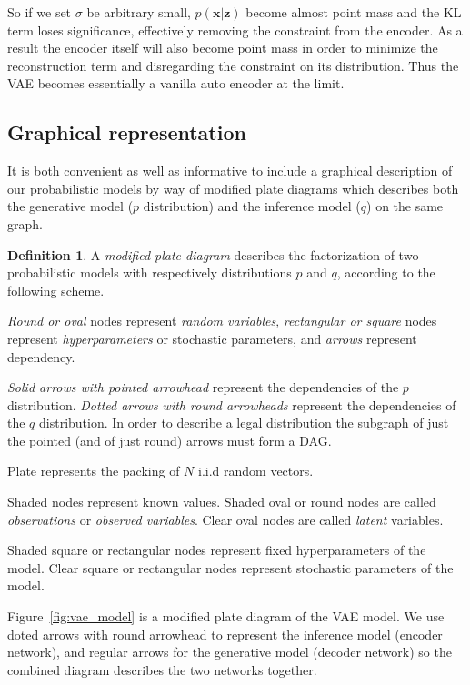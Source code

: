 \documentclass[11pt, a4paper]{report}
\theoremstyle{plain}
\theoremstyle{definition}
\newtheorem{mydef}{Definition}[chapter]
\theoremstyle{remark}
\newcommand{\x}{\mathbf{x}}
\newcommand{\z}{\mathbf{z}}
\begin{document}
So if we set $\sigma$ be arbitrary small, $p(\x | \z)$ become almost point mass
and the KL term loses significance, effectively removing the constraint from the
encoder. As a result the encoder itself
will also become point mass in order to minimize the reconstruction term and
disregarding the constraint on its distribution.
Thus the VAE becomes essentially a vanilla auto encoder at the limit.

\subsection{Graphical representation}
\label{sseq:graphical_representation}

It is both convenient as well as informative to include a graphical description
of our probabilistic models by way of modified plate diagrams which describes
both the generative model ($p$ distribution) and the inference model ($q$) on
the same graph.

\begin{mydef}
\label{def:platediagram}
A \emph{modified plate diagram} describes the factorization of two probabilistic
models with respectively
distributions $p$ and $q$, according to the following scheme.

\emph{Round or oval} nodes represent \emph{random variables}, \emph{rectangular
or square} nodes represent \emph{hyperparameters} or stochastic parameters,
and \emph{arrows} represent
dependency.

\emph{Solid arrows with pointed arrowhead} represent the dependencies of the $p$
distribution. \emph{Dotted arrows with round arrowheads} represent the dependencies of
the $q$ distribution.
In order to describe a legal distribution the subgraph of just the pointed
(and of just round) arrows must form a DAG.

Plate represents the packing of $N$ i.i.d random vectors.

Shaded nodes represent known values.
Shaded oval or round nodes are called \emph{observations} or \emph{observed
variables}.
Clear oval nodes are called \emph{latent} variables. 

Shaded square or rectangular nodes represent fixed hyperparameters of the model.
Clear square or rectangular nodes represent stochastic parameters of the model.
\end{mydef}

Figure~\ref{fig:vae_model} is a modified plate diagram of the VAE model.
We use doted arrows with round arrowhead to represent the inference model
(encoder network),
and regular arrows for the generative model (decoder network) so the combined
diagram describes the two networks together.
\end{document}
